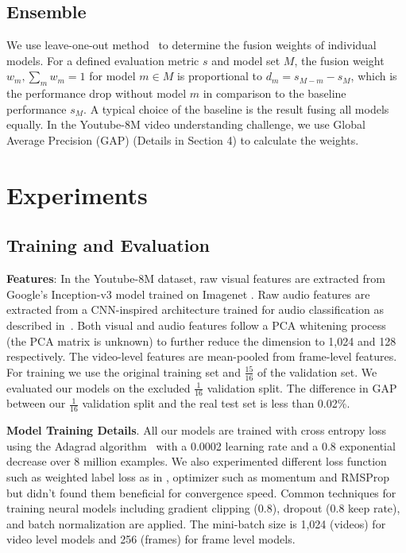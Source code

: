 \documentclass[10pt,twocolumn,letterpaper]{article}
\begin{document}
\subsection{Ensemble}
We use leave-one-out method~\cite{lan2013cmu} to determine the fusion weights of individual models. For a defined evaluation metric $s$ and model set $M$, the fusion weight $w_m, \sum_m w_m = 1$ for model $m \in M$ is proportional to $d_m = s_{M-m} - s_{M}$, which is the performance drop without model $m$ in comparison to the baseline performance $s_{M}$. A typical choice of the baseline is the result fusing all models equally. In the Youtube-8M video understanding challenge, we use Global Average Precision (GAP) (Details in Section 4) to calculate the weights.




\section{Experiments}
\subsection{Training and Evaluation}

\textbf{Features}: In the Youtube-8M dataset, raw visual features are extracted from Google's Inception-v3 model trained on Imagenet \cite{szegedy2016rethinking}. Raw audio features are extracted from a CNN-inspired architecture trained for audio classification as described in~\cite{hershey2017cnn}. Both visual and audio features follow a PCA whitening process (the PCA matrix is unknown) to further reduce the dimension to 1,024 and 128 respectively. The video-level features are mean-pooled from frame-level features. For training we use the original training set and $\frac{15}{16}$ of the validation set. We evaluated our models on the excluded $\frac{1}{16}$ validation split. The difference in GAP between our $\frac{1}{16}$ validation split and the real test set is less than 0.02\%.

\textbf{Model Training Details}. All our models are trained with cross entropy loss using the Adagrad algorithm~\cite{duchi2011adaptive} with a 0.0002 learning rate and a 0.8 exponential decrease over 8 million examples. We also experimented different loss function such as weighted label loss as in \cite{natarajan2013learning}, optimizer such as momentum and RMSProp but didn't found them beneficial for convergence speed. Common techniques for training neural models including gradient clipping (0.8), dropout (0.8 keep rate), and batch normalization are applied. The mini-batch size is 1,024 (videos) for video level models and 256 (frames) for frame level models.
\end{document}
